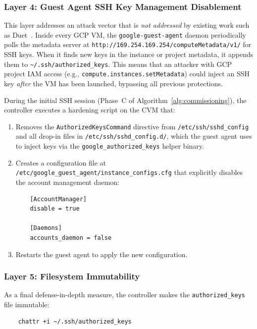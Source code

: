 \subsubsection{Layer 4: Guest Agent SSH Key Management Disablement}
\label{sec:commissioning:guestagent}

This layer addresses an attack vector that is \emph{not addressed} by existing work such as Duet~\cite{duet2024}. Inside every GCP VM, the \texttt{google-guest-agent} daemon periodically polls the metadata server at \texttt{http://169.254.169.254/computeMetadata/v1/} for SSH keys. When it finds new keys in the instance or project metadata, it appends them to \texttt{\~{}/.ssh/authorized\_keys}. This means that an attacker with GCP project IAM access (e.g., \texttt{compute.instances.setMetadata}) could inject an SSH key \emph{after} the VM has been launched, bypassing all previous protections.

During the initial SSH session (Phase~C of Algorithm~\ref{alg:commissioning}), the controller executes a hardening script on the CVM that:

\begin{enumerate}
    \item Removes the \texttt{AuthorizedKeysCommand} directive from \texttt{/etc/ssh/sshd\_config} and all drop-in files in \texttt{/etc/ssh/sshd\_config.d/}, which the guest agent uses to inject keys via the \texttt{google\_authorized\_keys} helper binary.
    \item Creates a configuration file at \texttt{/etc/google\_guest\_agent/instance\_configs.cfg} that explicitly disables the account management daemon:
    \begin{verbatim}
    [AccountManager]
    disable = true
    
    [Daemons]
    accounts_daemon = false
    \end{verbatim}
    \item Restarts the guest agent to apply the new configuration.
\end{enumerate}

\subsubsection{Layer 5: Filesystem Immutability}

As a final defense-in-depth measure, the controller makes the \texttt{authorized\_keys} file immutable:

\begin{verbatim}
    chattr +i ~/.ssh/authorized_keys
\end{verbatim}

